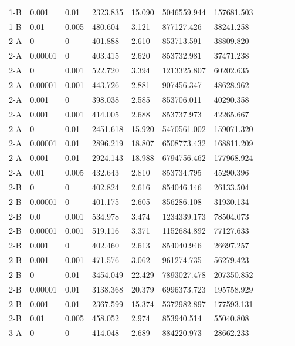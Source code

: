 \documentclass{tamuccthesis}
\begin{document}
\begin{appendices}
\begin{small}
\begin{longtable}{lllllllllll}
    1-B & 0.001 &  0.01 & 2323.835 & 15.090 & 5046559.944 & 157681.503 \\
    1-B &  0.01 & 0.005 &  480.604 &  3.121 &  877127.426 &  38241.258 \\
    2-A &         0 &   0 & 401.888 & 2.610 &  853713.591 & 38809.820 \\
    2-A & 0.00001 &     0 & 403.415 & 2.620 &  853732.981 & 37471.238 \\
    2-A &       0 & 0.001 & 522.720 & 3.394 & 1213325.807 & 60202.635 \\
    2-A & 0.00001 & 0.001 & 443.726 & 2.881 &  907456.347 & 48628.962 \\
    2-A & 0.001   &     0 &  398.038 &  2.585 &  853706.011 &  40290.358 \\
    2-A & 0.001   & 0.001 &  414.005 &  2.688 &  853737.973 &  42265.667 \\
    2-A &     0   &  0.01 & 2451.618 & 15.920 & 5470561.002 & 159071.320 \\
    2-A & 0.00001 &  0.01 & 2896.219 & 18.807 & 6508773.432 & 168811.209 \\
    2-A & 0.001 &  0.01 & 2924.143 & 18.988 & 6794756.462 & 177968.924 \\
    2-A &  0.01 & 0.005 &  432.643 &  2.810 &  853734.795 &  45290.396 \\
    2-B &       0 &     0 & 402.824 & 2.616 &  854046.146 & 26133.504 \\
    2-B & 0.00001 &     0 & 401.175 & 2.605 &  856286.108 & 31930.134 \\
    2-B &     0.0 & 0.001 & 534.978 & 3.474 & 1234339.173 & 78504.073 \\
    2-B & 0.00001 & 0.001 & 519.116 & 3.371 & 1152684.892 & 77127.633 \\
    2-B & 0.001   &     0 &  402.460 &  2.613 &  854040.946 &  26697.257 \\
    2-B & 0.001   & 0.001 &  471.576 &  3.062 &  961274.735 &  56279.423 \\
    2-B &     0   &  0.01 & 3454.049 & 22.429 & 7893027.478 & 207350.852 \\
    2-B & 0.00001 &  0.01 & 3138.368 & 20.379 & 6996373.723 & 195758.929 \\
    2-B & 0.001 &  0.01 & 2367.599 & 15.374 & 5372982.897 & 177593.131 \\
    2-B &  0.01 & 0.005 &  458.052 &  2.974 &  853940.514 &  55040.808 \\
    3-A &       0 &     0 & 414.048 & 2.689 &  884220.973 & 28662.233 \\

\end{longtable}
\end{small}
\end{appendices}
\end{document}

